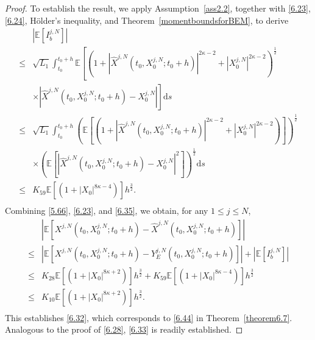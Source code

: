 \documentclass[12pt]{article}
\numberwithin{equation}{section}
\begin{document}
\begin{proof} 
To establish the result, we apply Assumption~\ref{ass2.2}, together with \eqref{6.23}, \eqref{6.24}, H\"older's inequality, and Theorem~\ref{momentboundsforBEM}, to derive
\begin{equation}\tag{5.133}\label{6.35}
\begin{aligned}
	&\left| \mathbb{E} \left[ I_{b}^{j,N} \right] \right|\\
\le &\sqrt{L_1}\int_{t_0}^{t_0+h}{\mathbb{E}}\left[ \left( 1+\left|\hat{X}^{j,N}\left( t_0,X^{j,N}_0;t_0+h \right)\right |^{2\kappa -2}+\left|X^{j,N}_0\right|^{2\kappa -2} \right) ^{\frac{1}{2}}\right.\\
& \left.\times\left|\hat{X}^{j,N}\left( t_0,X^{j,N}_0;t_0+h \right) -X^{j,N}_0\right| \right] \mathrm{d}s\\
\le &\sqrt{L_1}\int_{t_0}^{t_0+h}{\left( \mathbb{E} \left[ \left( 1+\left|\hat{X}^{j,N}\left( t_0,X^{j,N}_0;t_0+h \right) \right|^{2\kappa -2}+\left|X^{j,N}_0\right|^{2\kappa -2} \right)  \right] \right) ^{\frac{1}{2}}}\\
&\times \left( \mathbb{E} \left[ \left|\hat{X}^{j,N}\left( t_0,X^{j,N}_0;t_0+h \right) -X^{j,N}_0\right|^{2} \right] \right) ^{\frac{1}{2}}\mathrm{d}s\\
\le &K_{59}\mathbb{E} \left[ \left(1+\left|X_0\right|^{8\kappa -4}\right) \right] h^{\frac{3}{2}}.\\
\end{aligned}
\end{equation}
Combining \eqref{5.66}, \eqref{6.23}, and \eqref{6.35}, we obtain, for any $1 \leq j \leq N$,
\begin{equation}\tag{5.134}\label{6.36}
\begin{aligned}
	&\left|\mathbb{E} \left[X^{j,N}\left( t_0,X^{j,N}_0;t_0+h \right) -\hat{X}^{j,N}\left( t_0,X^{j,N}_0;t_0+h \right)\right ]\right|\\
	\le& \left| \mathbb{E} \left[ X^{j,N}\left( t_0,X^{j,N}_0;t_0+h \right) -Y_{E}^{j,N}\left(t_0,X^{j,N}_0;t_0+h\right) \right] \right|+\left| \mathbb{E} \left[ I_{b}^{j,N} \right] \right|\\
	\le& K_{28}\mathbb{E} \left[ \left(1+\left|X_0\right|^{8\kappa +2}\right) \right] h^{\frac{3}{2}}+K_{59}\mathbb{E} \left[ \left(1+\left|X_0\right|^{8\kappa -4}\right) \right] h^{\frac{3}{2}}\\
	\le& K_{10}\mathbb{E} \left[ \left(1+\left|X_0\right|^{8\kappa +2}\right) \right] h^{\frac{3}{2}}.\\
\end{aligned}
\end{equation}
This establishes \eqref{6.32}, which corresponds to \eqref{6.44} in Theorem~\ref{theorem6.7}. 
Analogous to the proof of \eqref{6.28}, \eqref{6.33} is readily established.
\end{proof} 
\end{document}
